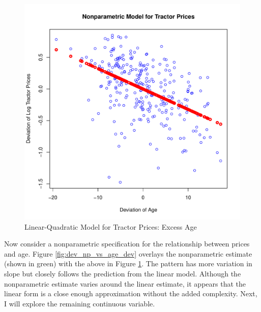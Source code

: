 \documentclass[11pt]{paper}
\begin{document}
\begin{figure}[h!]
  \centering
  \includegraphics[scale = 0.5, keepaspectratio=true]{../Figures/dev_vs_age_dev}
  \caption{Linear-Quadratic Model for Tractor Prices: Excess Age} \label{fig:dev_vs_age_dev}
\end{figure}

\clearpage
Now consider a nonparametric specification for 
the relationship between prices and age.
Figure \ref{fig:dev_np_vs_age_dev} 
overlays the nonparametric estimate (shown in green) with the above in 
Figure \ref{fig:dev_vs_age_dev}.
The pattern has more variation in slope but 
closely follows the prediction from the linear model. 
Although the nonparametric estimate varies around the linear estimate,
it appears that the linear form
is a close enough approximation without the added complexity.
Next, I will explore the remaining continuous variable.
\end{document}
